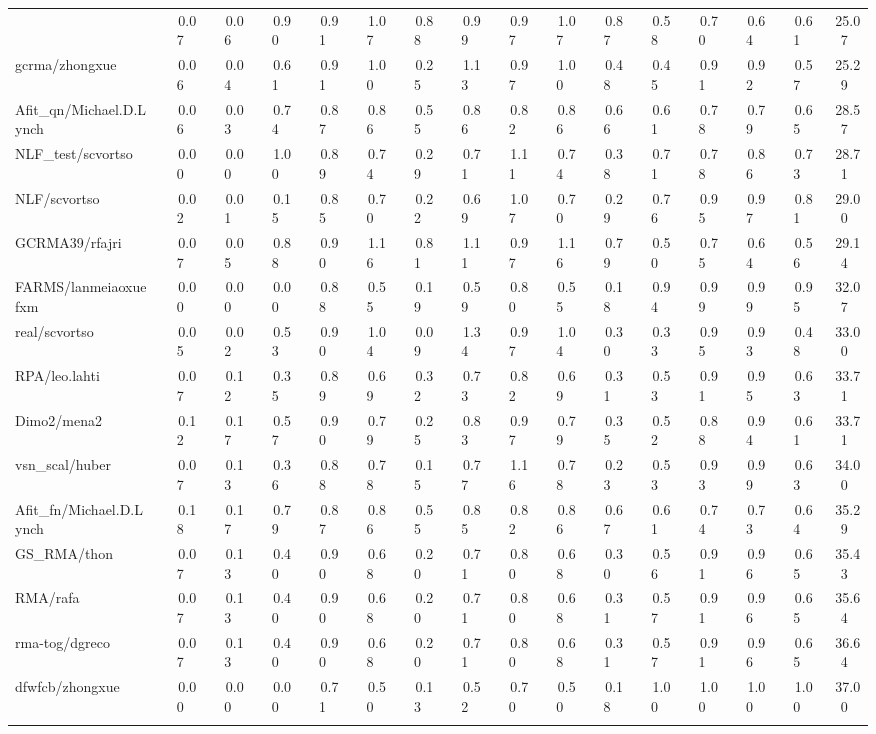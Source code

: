 \begin{table}[hptb]
\begin{center}
\begin{tabular}{|l||c|c|c|c|c|c|c|c|c|c|c|c|c|c|c|}
{GCRMAm/rfajri&~~0.07&~~0.06&~~0.90&~~0.91&~~1.07&~~0.88&~~0.99&~~0.97&~~1.07&~~0.87&~~0.58&~~0.70&~~0.64&~~0.61&~25.07\\ 
gcrma/zhongxue&~~0.06&~~0.04&~~0.61&~~0.91&~~1.00&~~0.25&~~1.13&~~0.97&~~1.00&~~0.48&~~0.45&~~0.91&~~0.92&~~0.57&~25.29\\ 
Afit_qn/Michael.D.Lynch&~~0.06&~~0.03&~~0.74&~~0.87&~~0.86&~~0.55&~~0.86&~~0.82&~~0.86&~~0.66&~~0.61&~~0.78&~~0.79&~~0.65&~28.57\\ 
NLF_test/scvortso&~~0.00&~~0.00&~~1.00&~~0.89&~~0.74&~~0.29&~~0.71&~~1.11&~~0.74&~~0.38&~~0.71&~~0.78&~~0.86&~~0.73&~28.71\\ 
NLF/scvortso&~~0.02&~~0.01&~~0.15&~~0.85&~~0.70&~~0.22&~~0.69&~~1.07&~~0.70&~~0.29&~~0.76&~~0.95&~~0.97&~~0.81&~29.00\\ 
GCRMA39/rfajri&~~0.07&~~0.05&~~0.88&~~0.90&~~1.16&~~0.81&~~1.11&~~0.97&~~1.16&~~0.79&~~0.50&~~0.75&~~0.64&~~0.56&~29.14\\ 
FARMS/lanmeiaoxuefxm&~~0.00&~~0.00&~~0.00&~~0.88&~~0.55&~~0.19&~~0.59&~~0.80&~~0.55&~~0.18&~~0.94&~~0.99&~~0.99&~~0.95&~32.07\\ 
real/scvortso&~~0.05&~~0.02&~~0.53&~~0.90&~~1.04&~~0.09&~~1.34&~~0.97&~~1.04&~~0.30&~~0.33&~~0.95&~~0.93&~~0.48&~33.00\\ 
RPA/leo.lahti&~~0.07&~~0.12&~~0.35&~~0.89&~~0.69&~~0.32&~~0.73&~~0.82&~~0.69&~~0.31&~~0.53&~~0.91&~~0.95&~~0.63&~33.71\\ 
Dimo2/mena2&~~0.12&~~0.17&~~0.57&~~0.90&~~0.79&~~0.25&~~0.83&~~0.97&~~0.79&~~0.35&~~0.52&~~0.88&~~0.94&~~0.61&~33.71\\ 
vsn_scal/huber&~~0.07&~~0.13&~~0.36&~~0.88&~~0.78&~~0.15&~~0.77&~~1.16&~~0.78&~~0.23&~~0.53&~~0.93&~~0.99&~~0.63&~34.00\\ 
Afit_fn/Michael.D.Lynch&~~0.18&~~0.17&~~0.79&~~0.87&~~0.86&~~0.55&~~0.85&~~0.82&~~0.86&~~0.67&~~0.61&~~0.74&~~0.73&~~0.64&~35.29\\ 
GS_RMA/thon&~~0.07&~~0.13&~~0.40&~~0.90&~~0.68&~~0.20&~~0.71&~~0.80&~~0.68&~~0.30&~~0.56&~~0.91&~~0.96&~~0.65&~35.43\\ 
RMA/rafa&~~0.07&~~0.13&~~0.40&~~0.90&~~0.68&~~0.20&~~0.71&~~0.80&~~0.68&~~0.31&~~0.57&~~0.91&~~0.96&~~0.65&~35.64\\ 
rma-tog/dgreco&~~0.07&~~0.13&~~0.40&~~0.90&~~0.68&~~0.20&~~0.71&~~0.80&~~0.68&~~0.31&~~0.57&~~0.91&~~0.96&~~0.65&~36.64\\ 
dfwfcb/zhongxue&~~0.00&~~0.00&~~0.00&~~0.71&~~0.50&~~0.13&~~0.52&~~0.70&~~0.50&~~0.18&~~1.00&~~1.00&~~1.00&~~1.00&~37.00\\ 
}
\end{tabular}
\end{center}
\end{table}
